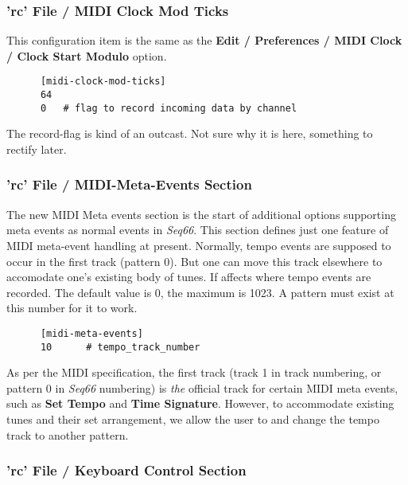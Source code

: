 \subsubsection{'rc' File / MIDI Clock Mod Ticks}
\label{subsubsec:configuration_rc_midi_cmt}

   This configuration item is the same as the
   \textbf{Edit / Preferences / MIDI Clock / Clock Start Modulo} option.

   \begin{verbatim}
      [midi-clock-mod-ticks]
      64
      0   # flag to record incoming data by channel
   \end{verbatim}

   The record-flag is kind of an outcast.  Not sure why it is here,
   something to rectify later.

\subsubsection{'rc' File / MIDI-Meta-Events Section}
\label{subsubsec:configuration_rc_midi_meta_events}

   The new MIDI Meta events section is the start of additional options
   supporting meta events as normal events in \textsl{Seq66}.
   This section defines just one feature of MIDI meta-event handling at present.
   Normally, tempo events are supposed to occur in the first track (pattern 0).
   But one can move this track elsewhere to accomodate one's existing body of
   tunes.  If affects where tempo events are recorded.  The default value is 0,
   the maximum is 1023.  A pattern must exist at this number for it to work.

   \begin{verbatim}
      [midi-meta-events]
      10      # tempo_track_number
   \end{verbatim}

   As per the MIDI specification, the first track (track 1 in track
   numbering, or pattern 0 in \textsl{Seq66} numbering) is \textsl{the}
   official track for certain MIDI meta events, such as
   \textbf{Set Tempo} and
   \textbf{Time Signature}.
   However, to accommodate existing tunes and their set
   arrangement, we allow the user to
   and change the tempo track to another pattern.

\subsubsection{'rc' File / Keyboard Control Section}
\label{subsubsec:configuration_rc_keyboard_control}

